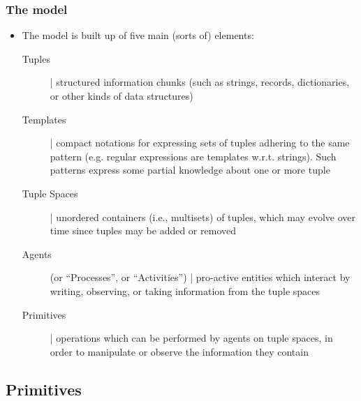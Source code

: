 \documentclass[presentation]{beamer}\mode<presentation>{\usetheme{AMSCesenaPurpleAndGold}}
\begin{document}
\begin{frame}%
\frametitle{The \linda{} model}

\begin{itemize}
	\item The \linda{} model is built up of five main (sorts of) elements:
	\begin{description}
		\item[Tuples] | structured information chunks (such as strings, records, dictionaries, or other kinds of \alert{data structures})
		
		\item[Templates] | compact notations for expressing sets of tuples adhering to the same pattern (e.g. regular expressions are templates w.r.t. strings).
		Such patterns express some \alert{partial knowledge} about one or more tuple
		
		\item[Tuple Spaces] | unordered containers (i.e., \alert{multisets}) of tuples, which may evolve over time since tuples may be added or removed
		
		\item[Agents] (or ``Processes'', or ``Activities'') | pro-active entities which interact by writing, observing, or taking information from the tuple spaces
		
		\item[Primitives] | operations which can be performed by agents on tuple spaces, in order to manipulate or observe the information they contain
	\end{description}
\end{itemize}
\end{frame}

\subsection{Primitives} 
\end{document}
